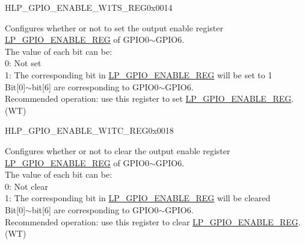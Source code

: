 \begin{register}{H}{LP\_GPIO\_ENABLE\_W1TS\_REG}{0x0014}\label{regdesc:LPGPIOENABLEW1TSREG}
%
%
\regnewline%
\begin{regdesc}\begin{reglist}
\label{fielddesc:LPGPIOENABLEW1TS}\item [LP\_GPIO\_ENABLE\_W1TS] Configures whether or not to set the output enable register \hyperref[regdesc:LPGPIOENABLEREG]{LP\_GPIO\_ENABLE\_REG} of GPIO0$\sim$GPIO6.\\
The value of each bit can be:\\
0: Not set\\
1: The corresponding bit in \hyperref[regdesc:LPGPIOENABLEREG]{LP\_GPIO\_ENABLE\_REG} will be set to 1\\
Bit[0]$\sim$bit[6] are corresponding to GPIO0$\sim$GPIO6.\\
Recommended operation: use this register to set \hyperref[regdesc:LPGPIOENABLEREG]{LP\_GPIO\_ENABLE\_REG}.\\
(WT)
\end{reglist}\end{regdesc}
\end{register}


\begin{register}{H}{LP\_GPIO\_ENABLE\_W1TC\_REG}{0x0018}\label{regdesc:LPGPIOENABLEW1TCREG}
%
%
\regnewline%
\begin{regdesc}\begin{reglist}
\label{fielddesc:LPGPIOENABLEW1TC}\item [LP\_GPIO\_ENABLE\_W1TC] Configures whether or not to clear the output enable register \hyperref[regdesc:LPGPIOENABLEREG]{LP\_GPIO\_ENABLE\_REG} of GPIO0$\sim$GPIO6.\\
The value of each bit can be:\\
0: Not clear\\
1: The corresponding bit in \hyperref[regdesc:LPGPIOENABLEREG]{LP\_GPIO\_ENABLE\_REG} will be cleared\\
Bit[0]$\sim$bit[6] are corresponding to GPIO0$\sim$GPIO6.\\
Recommended operation: use this register to clear \hyperref[regdesc:LPGPIOENABLEREG]{LP\_GPIO\_ENABLE\_REG}.\\
(WT)
\end{reglist}\end{regdesc}
\end{register}


